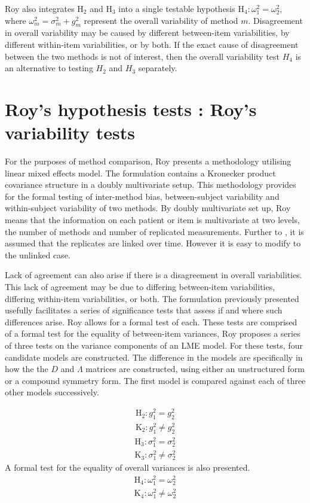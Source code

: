 \documentclass[12pt, a4paper]{report}
\theoremstyle{plain}
\theoremstyle{definition}
\theoremstyle{remark}
\begin{document}
Roy also integrates $\mathrm{H}_2$ and $\mathrm{H}_3$ into a single testable hypothesis $\mathrm{H}_4\colon \omega^2_1=\omega^2_2,$ where $\omega^2_m = \sigma^2_m + g^2_m$ represent the overall variability of method $m.$  Disagreement in overall variability may be caused by different between-item variabilities, by different within-item variabilities, or by both.  If the exact cause of disagreement between the two methods is not of interest, then the overall variability test $H_4$ is an alternative to testing $H_2$ and $H_3$ separately.



\section{Roy's hypothesis tests : Roy's variability tests}

For the purposes of method comparison, Roy presents a methodology utilising linear mixed effects model. The formulation contains a Kronecker product covariance structure in a doubly multivariate setup. This methodology provides for the formal testing of inter-method bias, between-subject variability and within-subject variability of two methods. By doubly multivariate set up, Roy means that the information on each patient or item is multivariate at two levels, the number of methods and number of replicated measurements. Further to \citet{Lam}, it is assumed that the replicates are linked over time. However it is easy to modify to the unlinked case.

Lack of agreement can also arise if there is a disagreement in overall variabilities. This lack of agreement may be due to differing between-item variabilities, differing within-item variabilities, or both. The formulation previously presented usefully facilitates a series of significance tests that assess if and where such differences arise. Roy allows for a formal test of each. These tests are comprised of a formal test for the equality of between-item variances,
Roy proposes a series of three tests on the variance components of an LME model. For these tests, four candidate models are constructed. The difference in the models are specifically in how the the $D$ and $\Lambda$ matrices are constructed, using either an unstructured form or a compound symmetry form. The first model is compared against each of three other models successively.

\begin{eqnarray*}
	\operatorname{H_2} : g^2_1 = g^2_2 \\
	\operatorname{K_2} : g^2_1 \neq g^2_2
\end{eqnarray*}%
\begin{eqnarray*}
	\operatorname{H_3} : \sigma^2_1 = \sigma^2_2 \\
	\operatorname{K_3} : \sigma^2_1 \neq \sigma^2_2
\end{eqnarray*}
A formal test for the equality of overall variances is also presented.
\begin{eqnarray*}
	\operatorname{H_4} : \omega^2_1 = \omega^2_2 \\
	\operatorname{K_4} : \omega^2_1 \neq \omega^2_2
\end{eqnarray*}
\end{document}
